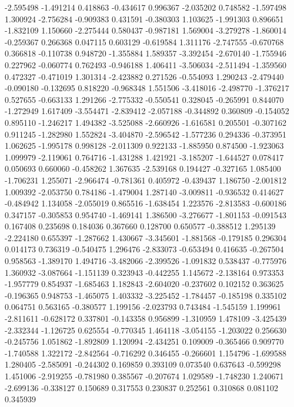 -2.595498
-1.491214
0.418863
-0.434617
0.996367
-2.035202
0.748582
-1.597498
1.300924
-2.756284
-0.909383
0.431591
-0.380303
1.103625
-1.991303
0.896651
-1.832109
1.150660
-2.275444
0.580437
-0.987181
1.569004
-3.279278
-1.860014
-0.259367
0.266368
0.047115
0.603129
-0.619584
1.311176
-2.747555
-0.670768
0.366818
-0.110738
0.948720
-1.355884
1.589357
-3.392454
-2.670140
-1.755946
0.227962
-0.060774
0.762493
-0.946188
1.406411
-3.506034
-2.511494
-1.359560
0.472327
-0.471019
1.301314
-2.423882
0.271526
-0.554093
1.290243
-2.479440
-0.090180
-0.132695
0.818220
-0.968348
1.551506
-3.418016
-2.498770
-1.376217
0.527655
-0.663133
1.291266
-2.775332
-0.550541
0.328045
-0.265991
0.844070
-1.272949
1.617409
-3.554471
-2.839412
-2.057188
-0.344892
0.360809
-0.154052
0.895110
-1.246217
1.494382
-3.525088
-2.660926
-1.616581
0.205501
-0.307162
0.911245
-1.282980
1.552824
-3.404870
-2.596542
-1.577236
0.294336
-0.373951
1.062625
-1.995178
0.998128
-2.011309
0.922133
-1.885950
0.874500
-1.923063
1.099979
-2.119061
0.764716
-1.431288
1.421921
-3.185207
-1.644527
0.078417
0.050693
0.660060
-0.458262
1.367635
-2.539168
0.194427
-0.327165
1.085400
-1.706231
1.255071
-2.966474
-0.781361
0.405972
-0.439437
1.186750
-2.001812
1.009392
-2.053750
0.784186
-1.479004
1.287140
-3.009811
-0.936532
0.414627
-0.484942
1.134058
-2.055019
0.865516
-1.638454
1.223576
-2.813583
-0.600186
0.347157
-0.305853
0.954740
-1.469141
1.386500
-3.276677
-1.801153
-0.091543
0.167408
0.235698
0.184036
0.367660
0.128700
0.650577
-0.388512
1.295139
-2.224180
0.655397
-1.287662
1.430667
-3.345601
-1.881568
-0.179185
0.296304
0.014173
0.736319
-0.540475
1.296476
-2.833073
-0.653494
0.416635
-0.267504
0.958563
-1.389170
1.494716
-3.482066
-2.399526
-1.091832
0.538437
-0.775976
1.360932
-3.087664
-1.151139
0.323943
-0.442255
1.145672
-2.138164
0.973353
-1.957779
0.854937
-1.685463
1.182843
-2.604020
-0.237602
0.102152
0.363625
-0.196365
0.948753
-1.465075
1.403332
-3.225452
-1.784457
-0.185198
0.335102
0.064751
0.563165
-0.380577
1.199156
-2.023793
0.743484
-1.545159
1.199961
-2.811611
-0.628172
0.337801
-0.143358
0.956899
-1.310959
1.478109
-3.425439
-2.332344
-1.126725
0.625554
-0.770345
1.464118
-3.054155
-1.203022
0.256630
-0.245756
1.051862
-1.892809
1.120994
-2.434251
0.109009
-0.365466
0.909770
-1.740588
1.322172
-2.842564
-0.716292
0.346455
-0.266601
1.154796
-1.699588
1.280405
-2.585091
-0.244302
0.169859
0.393109
0.073540
0.637643
-0.599298
1.451006
-2.919255
-0.781980
0.385567
-0.207674
1.029589
-1.748230
1.240671
-2.699136
-0.338127
0.150689
0.317553
0.230837
0.252561
0.310868
0.081102
0.345939
